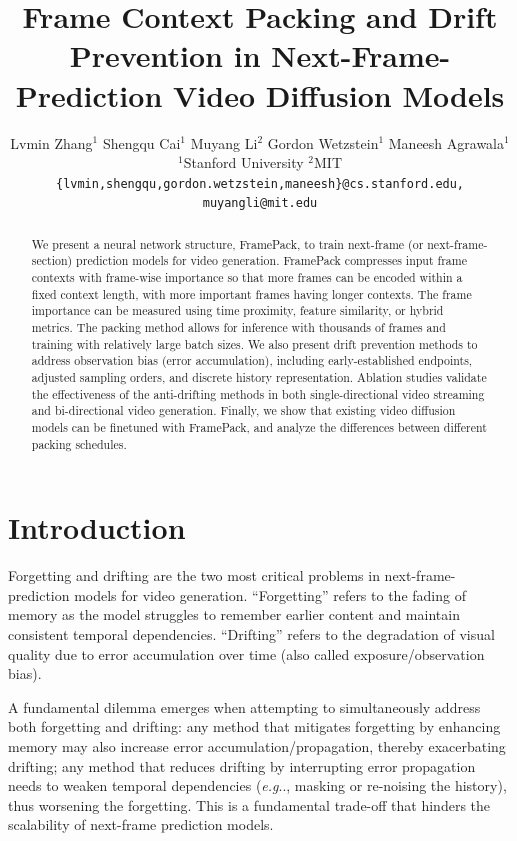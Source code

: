 \documentclass{article}
\title{Frame Context Packing and Drift Prevention in Next-Frame-Prediction Video Diffusion Models}
\author{
  Lvmin Zhang$^{1}$ \quad
  Shengqu Cai$^{1}$ \quad
  Muyang Li$^{2}$ \quad
  Gordon Wetzstein$^{1}$ \quad
  Maneesh Agrawala$^{1}$ \\
  $^{1}$Stanford University \quad $^{2}$MIT \\
  \texttt{\{lvmin,shengqu,gordon.wetzstein,maneesh\}@cs.stanford.edu, muyangli@mit.edu}
}
\makeatletter
\DeclareRobustCommand\onedot{\futurelet\@let@token\@onedot}
\def\@onedot{\ifx\@let@token.\else.\null\fi\xspace}
\def\eg{\emph{e.g}\onedot}
\makeatother
\begin{document}
\maketitle

\begin{abstract}
We present a neural network structure, FramePack, to train next-frame (or next-frame-section) prediction models for video generation.
FramePack compresses input frame contexts with frame-wise importance so that more frames can be encoded within a fixed context length, with more important frames having longer contexts.
The frame importance can be measured using time proximity, feature similarity, or hybrid metrics.
The packing method allows for inference with thousands of frames and training with relatively large batch sizes.
We also present drift prevention methods to address observation bias (error accumulation), including early-established endpoints, adjusted sampling orders, and discrete history representation.
Ablation studies validate the effectiveness of the anti-drifting methods in both single-directional video streaming and bi-directional video generation.
Finally, we show that existing video diffusion models can be finetuned with FramePack, and analyze the differences between different packing schedules.
\end{abstract}

\section{Introduction}

Forgetting and drifting are the two most critical problems in next-frame-prediction models for video generation. ``Forgetting'' refers to the fading of memory as the model struggles to remember earlier content and maintain consistent temporal dependencies. ``Drifting'' refers to the degradation of visual quality due to error accumulation over time (also called exposure/observation bias).

A fundamental dilemma emerges when attempting to simultaneously address both forgetting and drifting: any method that mitigates forgetting by enhancing memory may also increase error accumulation/propagation, thereby exacerbating drifting; any method that reduces drifting by interrupting error propagation needs to weaken temporal dependencies (\eg, masking or re-noising the history), thus worsening the forgetting. This is a fundamental trade-off that hinders the scalability of next-frame prediction models.
\end{document}

